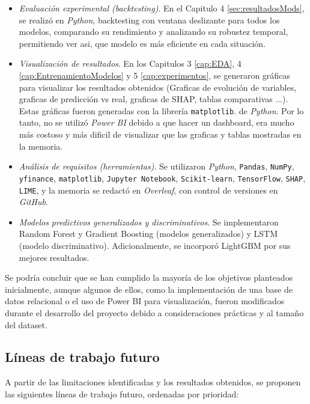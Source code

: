 \begin{itemize}
    \item \emph{Evaluación experimental (backtesting)}. En el Capitulo 4 \ref{sec:resultadosMods}, se realizó en \emph{Python}, backtesting con ventana deslizante para todos los modelos, comparando su rendimiento y analizando su robustez temporal, permitiendo ver asi, que modelo es más eficiente en cada situación.
    \item \emph{Visualización de resultados}. En los Capitulos 3 \ref{cap:EDA}, 4 \ref{cap:EntrenamientoModelos} y 5 \ref{cap:experimentos}, se generaron gráficas para visualizar los resultados obtenidos (Graficas de evolución de variables, graficas de predicción vs real, graficas de SHAP, tablas comparativas ...). Estas gráficas fueron generadas con la librería \texttt{matplotlib}. de \emph{Python}. Por lo tanto, no se utilizó \emph{Power BI} debido a que hacer un dashboard, era mucho más costoso y más dificil de visualizar que las graficas y tablas mostradas en la memoria.
    \item \emph{Análisis de requisitos (herramientas)}. Se utilizaron \emph{Python}, \texttt{Pandas}, \texttt{NumPy}, \texttt{yfinance}, \texttt{matplotlib}, \texttt{Jupyter Notebook}, \texttt{Scikit-learn}, \texttt{TensorFlow}, \texttt{SHAP}, \texttt{LIME}, y la memoria se redactó en \emph{Overleaf}, con control de versiones en \emph{GitHub}.
    \item \emph{Modelos predictivos generalizados y discriminativos}. Se implementaron Random Forest y Gradient Boosting (modelos generalizados) y LSTM (modelo discriminativo). Adicionalmente, se incorporó LightGBM por sus mejores resultados.
\end{itemize}

Se podría concluir que se han cumplido la mayoría de los objetivos planteados inicialmente, aunque algunos de ellos, como la implementación de una base de datos relacional o el uso de Power BI para visualización, fueron modificados durante el desarrollo del proyecto debido a consideraciones prácticas y al tamaño del dataset.

\subsection{Líneas de trabajo futuro}
A partir de las limitaciones identificadas y los resultados obtenidos, se proponen las siguientes líneas de trabajo futuro, ordenadas por prioridad:

